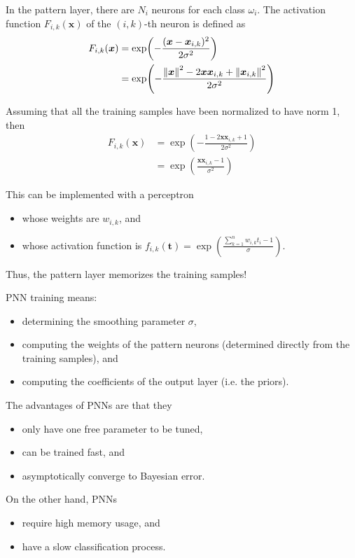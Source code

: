 \documentclass[oneside,onecolumn]{report}
\begin{document}
In the pattern layer, there are $N_i$ neurons for each class $\omega_i$.
The activation function $F_{i,k}(\bm x)$ of the $(i, k)$-th neuron is defined as
\begin{align*}
    F_{i,k}(\bm x)
    &= \exp(-\frac{(\bm x - \bm x_{i,k})^2}{2 \sigma^2}) \\
    &= \exp(-\frac{\norm{\bm x}^2 - 2 \bm x \bm x_{i,k} + \norm{\bm x_{i,k}}^2}{2 \sigma^2})
\end{align*}

Assuming that all the training samples have been normalized to have norm 1, then
\begin{align*}
F_{i,k}(\bm x)
    &= \exp(-\frac{1 - 2 \bm x \bm x_{i,k} + 1}{2 \sigma^2}) \\
    &= \exp(\frac{\bm x \bm x_{i,k} - 1}{ \sigma^2})
\end{align*}

This can be implemented with a perceptron
\begin{itemize}
    \item whose weights are $w_{i,k}$, and
    \item whose activation function is $f_{i, k}(\bm t) = \exp(\frac{\sum_{k=1}^n w_{i, k} t_i - 1}{\sigma})$.
\end{itemize}

Thus, the pattern layer memorizes the training samples!

PNN training means:
\begin{itemize}
    \item determining the smoothing parameter $\sigma$,
    \item computing the weights of the pattern neurons (determined directly from the training samples), and
    \item computing the coefficients of the output layer (i.e. the priors).
\end{itemize}

The advantages of PNNs are that they
\begin{itemize}
    \item only have one free parameter to be tuned,
    \item can be trained fast, and
    \item asymptotically converge to Bayesian error.
\end{itemize}

On the other hand, PNNs
\begin{itemize}
    \item require high memory usage, and
    \item have a slow classification process.
\end{itemize}
\end{document}
